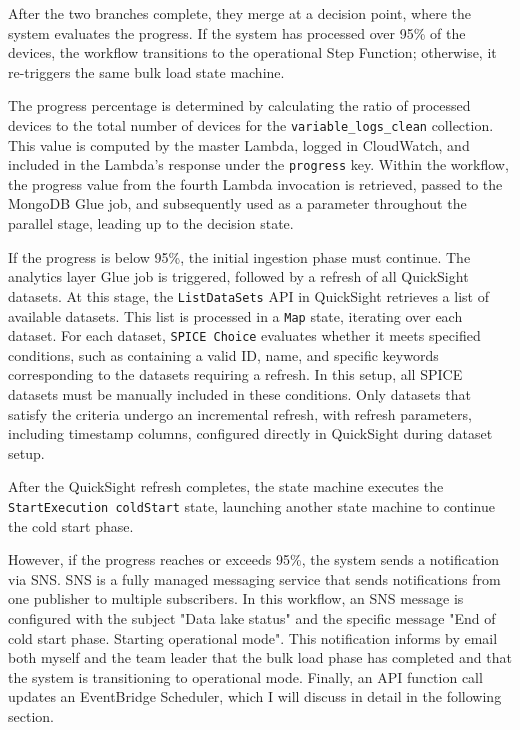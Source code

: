 After the two branches complete, they merge at a decision point, where the system evaluates the progress. If the system has processed over 95\% of the devices, the workflow transitions to the operational Step Function; otherwise, it re-triggers the same bulk load state machine. 

The progress percentage is determined by calculating the ratio of processed devices to the total number of devices for the \texttt{variable\_logs\_clean} collection. This value is computed by the master Lambda, logged in CloudWatch, and included in the Lambda's response under the \texttt{progress} key. Within the workflow, the progress value from the fourth Lambda invocation is retrieved, passed to the MongoDB Glue job, and subsequently used as a parameter throughout the parallel stage, leading up to the decision state. 

If the progress is below 95\%, the initial ingestion phase must continue. The analytics layer Glue job is triggered, followed by a refresh of all QuickSight datasets. At this stage, the \texttt{ListDataSets} \ac{API} in QuickSight retrieves a list of available datasets. This list is processed in a \texttt{Map} state, iterating over each dataset. For each dataset, \texttt{SPICE Choice} evaluates whether it meets specified conditions, such as containing a valid ID, name, and specific keywords corresponding to the datasets requiring a refresh. In this setup, all SPICE datasets must be manually included in these conditions. Only datasets that satisfy the criteria undergo an incremental refresh, with refresh parameters, including timestamp columns, configured directly in QuickSight during dataset setup.

After the QuickSight refresh completes, the state machine executes the \texttt{StartExecution coldStart} state, launching another state machine to continue the cold start phase.

However, if the progress reaches or exceeds 95\%, the system sends a notification via \ac{SNS}. \ac{SNS} is a fully managed messaging service that sends notifications from one publisher to multiple subscribers. In this workflow, an \ac{SNS} message is configured with the subject "Data lake status" and the specific message "End of cold start phase. Starting operational mode". This notification informs by email both myself and the team leader that the bulk load phase has completed and that the system is transitioning to operational mode. Finally, an \ac{API} function call updates an EventBridge Scheduler, which I will discuss in detail in the following section.

